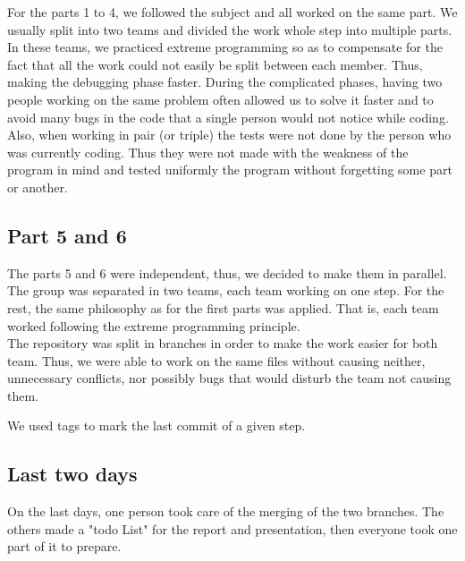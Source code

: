 For the parts 1 to 4, we followed the subject and all worked on the same part.
We usually split into two teams and divided the work  whole step into
multiple parts. In these teams, we practiced extreme programming so as to
compensate for the fact that all the work could not easily be split between
each member. Thus, making the debugging phase faster. During the complicated
phases, having two people working on the same problem often allowed us to
solve it faster and to avoid many bugs in the code that a single person would
not notice while coding.\\
Also, when working in pair (or triple) the tests were not done by the person
who was currently coding. Thus they were not made with the weakness of the
program in mind and tested uniformly the program without forgetting some part
or another.

\subsection{Part 5 and 6}

The parts 5 and 6 were independent, thus, we decided to make them in parallel.
The group was separated in two teams, each team working on one step.  For the
rest, the same philosophy as for the first parts was applied. That is, each
team worked following the extreme
programming principle.\\

The repository was split in branches in order to make the work easier for both
team. Thus, we were able to work on the same files without causing neither, unnecessary
conflicts, nor possibly bugs that would disturb the team not causing them. 

We used tags to mark the last commit of a given step.

\subsection{Last two days}

On the last days, one person took care of the merging of the two branches. The
others made a "todo List" for the report and presentation, then everyone took
one part of it to prepare. 

